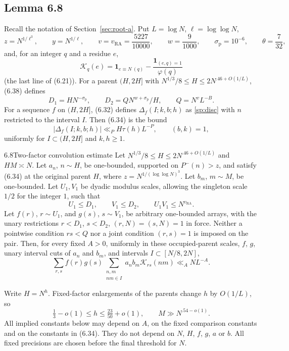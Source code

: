 \subsection{Lemma 6.8}\label{subsec:supp-lem-68}

Recall the notation of Section~\ref{sec:root-a}. Put $L=\log N$, $\ell=\log\log N$,
\[
 z=N^{1/\ell^3},\qquad y=N^{1/\ell},\qquad
 v=v_{\mathrm{RA}}=\frac{5227}{10000},\qquad w=\frac9{1000},\qquad
 \sigma_{\mathrm p}=10^{-6},\qquad \theta=\frac7{32},
\]
and, for an integer $q$ and a residue $e$,
\[
 \mathcal K_q(e)=\mathbf1_{e\equiv N\ (q)}-\frac{\mathbf1_{(e,q)=1}}{\varphi(q)}
 \tag{6.21}
\]
(the last line of (6.21)). For a parent $(H,2H]$ with
$N^{1/3}/8\le H\le2N^{.46+O(1/L)}$, (6.38) defines
\[
 D_1=HN^{-\sigma_{\mathrm p}},\qquad D_2=QN^{w+\sigma_{\mathrm p}}/H,
 \qquad Q=N^{v}L^{-B}.
 \tag{6.38}
\]
For a sequence $f$ on $(H,2H]$, (6.32) defines $\Delta_f(I;k,b;h)$ as
\eqref{sp:disc} with $n$ restricted to the interval $I$. Then (6.34) is the
bound
\[
 |\Delta_f(I;k,b;h)|\ll_PH\tau(h)L^{-P},\qquad(b,k)=1,
 \tag{6.34}
\]
uniformly for $I\subset(H,2H]$ and $k,h\ge1$.

\begin{mainlemma}{6.8}{Two-factor convolution estimate}
Let \(N^{1/3}/8\le H\le2N^{.46+O(1/L)}\) and \(HM\asymp N\). Let \(a_n\),
\(n\sim H\), be one-bounded, supported on \(P^-(n)>z\), and satisfy
\textup{(6.34)} at the original parent \(H\), where
\(z=N^{1/(\log\log N)^3}\). Let \(b_m\), \(m\sim M\), be one-bounded.
Let \(U_1,V_1\) be dyadic modulus scales, allowing the singleton scale
\(1/2\) for the integer \(1\), such that
\[
 U_1\le D_1,\qquad V_1\le D_2,\qquad U_1V_1\le N^{v_{\mathrm{RA}}}.
\]
Let \(f(r)\), \(r\sim U_1\), and \(g(s)\), \(s\sim V_1\), be arbitrary
one-bounded arrays, with the unary restrictions \(r<D_1\), \(s<D_2\),
\((r,N)=(s,N)=1\) in force. Neither a pointwise condition \(rs<Q\) nor a joint condition
\((r,s)=1\) is imposed on the pair. Then, for every fixed \(A>0\), uniformly in these
occupied-parent scales, \(f\), \(g\), unary interval cuts of \(a_n\) and
\(b_m\), and intervals \(I\subset[N/8,2N]\),
\[
 \sum_{r,s}f(r)g(s)
 \sum_{\substack{n,m\\nm\in I}}a_n b_m\mathcal K_{rs}(nm)\ll_A NL^{-A}.
 \tag{6.45}
\]
\end{mainlemma}

Write $H=N^h$. Fixed-factor enlargements of the parents change $h$ by
$O(1/L)$, so
\begin{equation}\label{sp:l52-h}
 \tfrac13-o(1)\le h\le\tfrac{23}{50}+o(1),\qquad
 M\gg N^{.54-o(1)} .
\end{equation}
All implied constants below may depend on $A$, on the fixed comparison
constants and on the constants in (6.34). They do not depend on $N$, $H$,
$f$, $g$, $a$ or $b$. All fixed precisions are chosen before the final
threshold for $N$.

